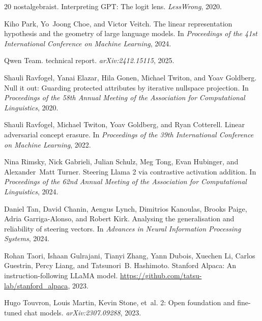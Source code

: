 \begin{thebibliography}{20}
nostalgebraist.
\newblock Interpreting {GPT}: The logit lens.
\newblock \emph{LessWrong}, 2020.

Kiho Park, Yo~Joong Choe, and Victor Veitch.
\newblock The linear representation hypothesis and the geometry of large language models.
\newblock In \emph{Proceedings of the 41st International Conference on Machine Learning}, 2024.

Qwen Team.
 technical report.
\newblock \emph{arXiv:2412.15115}, 2025.

Shauli Ravfogel, Yanai Elazar, Hila Gonen, Michael Twiton, and Yoav Goldberg.
\newblock Null it out: Guarding protected attributes by iterative nullspace projection.
\newblock In \emph{Proceedings of the 58th Annual Meeting of the Association for Computational Linguistics}, 2020.

Shauli Ravfogel, Michael Twiton, Yoav Goldberg, and Ryan Cotterell.
\newblock Linear adversarial concept erasure.
\newblock In \emph{Proceedings of the 39th International Conference on Machine Learning}, 2022.

Nina Rimsky, Nick Gabrieli, Julian Schulz, Meg Tong, Evan Hubinger, and Alexander~Matt Turner.
\newblock Steering {Llama} 2 via contrastive activation addition.
\newblock In \emph{Proceedings of the 62nd Annual Meeting of the Association for Computational Linguistics}, 2024.

Daniel Tan, David Chanin, Aengus Lynch, Dimitrios Kanoulas, Brooks Paige, Adria Garriga-Alonso, and Robert Kirk.
\newblock Analysing the generalisation and reliability of steering vectors.
\newblock In \emph{Advances in Neural Information Processing Systems}, 2024.

Rohan Taori, Ishaan Gulrajani, Tianyi Zhang, Yann Dubois, Xuechen Li, Carlos Guestrin, Percy Liang, and Tatsunori~B. Hashimoto.
\newblock Stanford {Alpaca}: An instruction-following {LLaMA} model.
\newblock \url{https://github.com/tatsu-lab/stanford_alpaca}, 2023.

Hugo Touvron, Louis Martin, Kevin Stone, et~al.
 2: Open foundation and fine-tuned chat models.
\newblock \emph{arXiv:2307.09288}, 2023.


\end{thebibliography}

